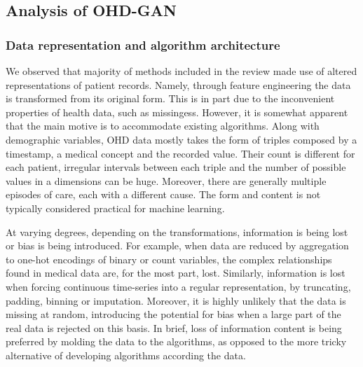 \documentclass[10pt]{article}
\begin{document}
\subsection{Analysis of OHD-GAN}
\subsubsection{Data representation and algorithm architecture}
We observed that majority of methods included in the review made use of  altered representations of patient records. Namely, through feature engineering the data is transformed from its original form. This is in part due to the inconvenient properties of health data, such as missingess. However, it is somewhat apparent that the main motive is to accommodate existing algorithms. Along with demographic variables, OHD data mostly takes the form of triples composed by a timestamp, a medical concept and the recorded value. Their count is different for each patient, irregular intervals between each triple and the number of possible values in a dimensions can be huge. Moreover, there are generally multiple episodes of care, each with a different cause. The form and content is not typically considered practical for machine learning. \par
At varying degrees, depending on the transformations, information is being lost or bias is being  introduced. For example, when data are reduced by aggregation to one-hot encodings of binary or count variables, the complex relationships found in medical data are, for the most part, lost. Similarly, information is lost when forcing continuous time-series into a regular representation, by truncating, padding, binning or imputation. Moreover, it is highly unlikely that the data is missing at random, introducing the potential for bias when a large part of the real data is rejected on this basis.  In brief, loss of information content is being preferred by molding the data to the algorithms, as opposed to the more tricky alternative of developing algorithms according the data.\par
\end{document}
